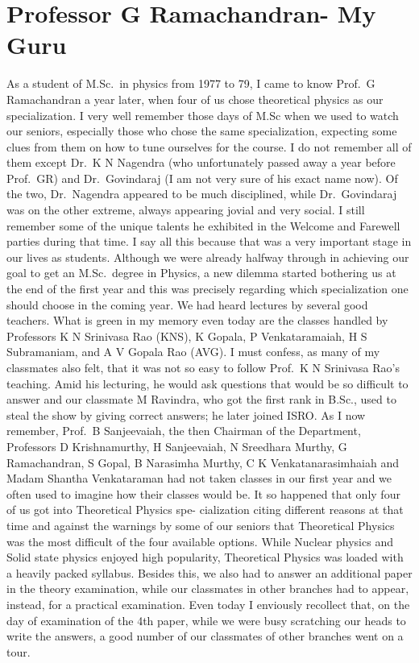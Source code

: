 \chapter[Professor G Ramachandran- My Guru]{Professor G Ramachandran- My Guru}\label{chap26}


\noindent
As a student of M.Sc.\ in physics from 1977 to 79, I came to know Prof.\ G Ramachandran a year later, when four of us chose theoretical physics as our specialization. I very well remember those days of M.Sc when we used to watch our seniors, especially those who chose the same specialization, expecting some clues from them on how to tune ourselves for the course. I do not remember all of them except Dr.\ K N Nagendra (who unfortunately passed away a year before Prof.\ GR) and Dr.\ Govindaraj (I am not very sure of his exact name now). Of the two, Dr.\ Nagendra appeared to be much disciplined, while Dr.\ Govindaraj was on the other extreme, always appearing jovial and very social. I still remember some of the unique talents he exhibited in the Welcome and Farewell parties during that time. I say all this because that was a very important stage in our lives as students. Although we were already halfway through in achieving our goal to get an M.Sc.\ degree in Physics, a new dilemma started bothering us at the end of the first year and this was precisely regarding which specialization one should choose in the coming year. We had heard lectures by several good teachers. What is green in my memory even today are the classes handled by Professors K N Srinivasa Rao (KNS), K Gopala, P Venkataramaiah, H S Subramaniam, and A V Gopala Rao (AVG). I must confess, as many of my classmates also felt, that it was not so easy to follow Prof.\ K N Srinivasa Rao's teaching. Amid his lecturing, he would ask questions that would be so difficult to answer and our classmate M Ravindra, who got the first rank in B.Sc., used to steal the show by giving correct answers; he later joined ISRO. As I now remember, Prof.\ B Sanjeevaiah, the then Chairman of the Department, Professors D Krishnamurthy, H Sanjeevaiah, N Sreedhara Murthy, G Ramachandran, S Gopal, B Narasimha Murthy, C K Venkatanarasimhaiah and Madam Shantha Venkataraman had not taken classes in our first year and we often used to imagine how their classes would be. It so happened that only four of us got into Theoretical Physics spe- cialization citing different reasons at that time and against the warnings by some of our seniors that Theoretical Physics was the most difficult of the four available options. While Nuclear physics and Solid state physics enjoyed high popularity, Theoretical Physics was loaded with a heavily packed syllabus. Besides this, we also had to answer an additional paper in the theory examination, while our classmates in other branches had to appear, instead, for a practical examination. Even today I enviously recollect that, on the day of examination of the 4th paper, while we were busy scratching our heads to write the answers, a good number of our classmates of other branches went on a tour.

